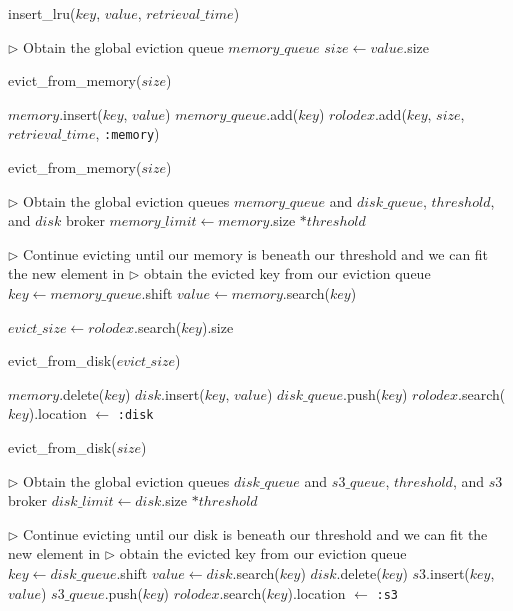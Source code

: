 \begin{algorithm}[htp]
\small
\caption{\label{alg:insert_lru}insert\_lru($key$, $value$, $retrieval\_time$)}
\begin{algorithmic}[1]
\STATE $\triangleright$ Obtain the global eviction queue $memory\_queue$
\STATE $size \leftarrow value$.size

  \STATE evict\_from\_memory($size$)
\ENDIF

\STATE $memory$.insert($key$, $value$)
\STATE $memory\_queue$.add($key$)
\STATE $rolodex$.add($key$, $size$, $retrieval\_time$, {\tt :memory})
\end{algorithmic}
\end{algorithm}

\begin{algorithm}[htp]
\small
\caption{\label{alg:evict_mem_lru}evict\_from\_memory($size$)}
\begin{algorithmic}[1]
\STATE $\triangleright$ Obtain the global eviction queues $memory\_queue$ and
$disk\_queue$, $threshold$, and $disk$ broker
\STATE $memory\_limit \leftarrow memory$.size $* threshold$

\STATE $\triangleright$ Continue evicting until our memory is beneath our
threshold and we can fit the new element in
  \STATE $\triangleright$ obtain the evicted key from our eviction queue
  \STATE $key \leftarrow memory\_queue$.shift
  \STATE $value \leftarrow memory$.search($key$)

	\STATE $evict\_size \leftarrow rolodex$.search($key$).size

		\STATE evict\_from\_disk($evict\_size$)
	\ENDIF

  \STATE $memory$.delete($key$)
  \STATE $disk$.insert($key$, $value$)
	\STATE $disk\_queue$.push($key$)
	\STATE $rolodex$.search($key$).location $\leftarrow$ {\tt :disk}
\ENDWHILE
\end{algorithmic}
\end{algorithm}

\begin{algorithm}[htp]
\small
\caption{\label{alg:evict_disk_lru}evict\_from\_disk($size$)}
\begin{algorithmic}[1]
\STATE $\triangleright$ Obtain the global eviction queues $disk\_queue$ and
$s3\_queue$, $threshold$, and $s3$ broker
\STATE $disk\_limit \leftarrow disk$.size $* threshold$

\STATE $\triangleright$ Continue evicting until our disk is beneath our
threshold and we can fit the new element in
  \STATE $\triangleright$ obtain the evicted key from our eviction queue
  \STATE $key \leftarrow disk\_queue$.shift
  \STATE $value \leftarrow disk$.search($key$)
  \STATE $disk$.delete($key$)
  \STATE $s3$.insert($key$, $value$)
	\STATE $s3\_queue$.push($key$)
	\STATE $rolodex$.search($key$).location $\leftarrow$ {\tt :s3}
\ENDWHILE
\end{algorithmic}
\end{algorithm}

